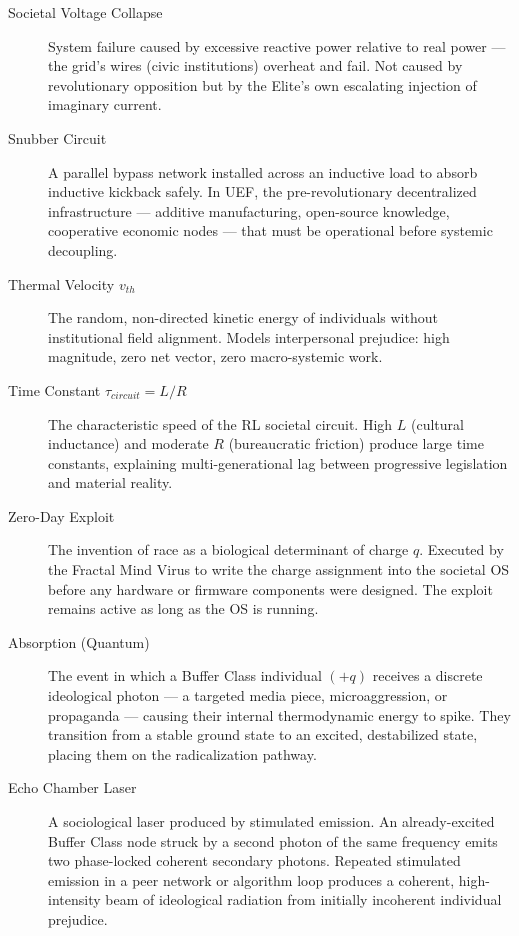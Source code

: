 \documentclass[12pt]{book}
\numberwithin{equation}{chapter}
\begin{document}
\begin{description}
\item[Societal Voltage Collapse] 
System failure caused by excessive reactive power relative to real power — the grid's wires (civic institutions) overheat and fail. Not caused by revolutionary opposition but by the Elite's own escalating injection of imaginary current.

\item[Snubber Circuit] 
A parallel bypass network installed across an inductive load to absorb inductive kickback safely. In UEF, the pre-revolutionary decentralized infrastructure — additive manufacturing, open-source knowledge, cooperative economic nodes — that must be operational before systemic decoupling.

\item[Thermal Velocity $v_{th}$] 
The random, non-directed kinetic energy of individuals without institutional field alignment. Models interpersonal prejudice: high magnitude, zero net vector, zero macro-systemic work.

\item[Time Constant $\tau_{circuit} = L/R$] 
The characteristic speed of the RL societal circuit. High $L$ (cultural inductance) and moderate $R$ (bureaucratic friction) produce large time constants, explaining multi-generational lag between progressive legislation and material reality.

\item[Zero-Day Exploit] 
The invention of race as a biological determinant of charge $q$. Executed by the Fractal Mind Virus to write the charge assignment into the societal OS before any hardware or firmware components were designed. The exploit remains active as long as the OS is running.

\item[Absorption (Quantum)] 
The event in which a Buffer Class individual $(+q)$ receives a discrete ideological photon — a targeted media piece, microaggression, or propaganda — causing their internal thermodynamic energy to spike. They transition from a stable ground state to an excited, destabilized state, placing them on the radicalization pathway.

\item[Echo Chamber Laser] 
A sociological laser produced by stimulated emission. An already-excited Buffer Class node struck by a second photon of the same frequency emits two phase-locked coherent secondary photons. Repeated stimulated emission in a peer network or algorithm loop produces a coherent, high-intensity beam of ideological radiation from initially incoherent individual prejudice.


\end{description}
\end{document}
